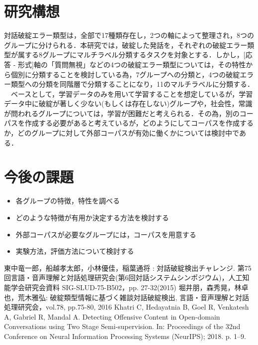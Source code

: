 \documentclass[upLaTex, 10pt,dvipdfmx,a4paper,twocolumn]{jsarticle}
\begin{document}
\section{研究構想}
    対話破綻エラー類型は，全部で17種類存在し，2つの軸によって整理され，8つのグループに分けられる．本研究では，破綻した発話を，それぞれの破綻エラー類型が属する8グループにマルチラベル分類するタスクを対象とする．しかし，[応答 - 形式]軸の「質問無視」などの4つの破綻エラー類型については，その特性から個別に分類することを検討している為，7グループへの分類と，4つの破綻エラー類型への分類を同階層で分類することになり，11のマルチラベルに分類する．\\
    　ベースとして，学習データのみを用いて学習することを想定しているが，学習データ中に破綻が著しく少ない(もしくは存在しない)グループや，社会性，常識が問われるグループについては，学習が困難だと考えられる．その為，別のコーパスを作成する必要があると考えているが，どのようにしてコーパスを作成するか，どのグループに対して外部コーパスが有効に働くかについては検討中である．

\section{今後の課題}
 \begin{itemize}
     \item 各グループの特徴，特性を調べる
     \item どのような特徴が有用か決定する方法を検討する
     \item 外部コーパスが必要なグループには，コーパスを用意する
     \item 実験方法，評価方法について検討する
 \end{itemize} 

 
 
\begin{thebibliography}{99}
     東中竜一郎，船越孝太郎，小林優佳，稲葉通将 : 対話破綻検出チャレンジ. 第75回言語・音声理解と対話処理研究会(第6回対話システムシンポジウム)，人工知能学会研究会資料 SIG-SLUD-75-B502，pp. 27-32(2015)
     堀井朋，森秀晃，林卓也，荒木雅弘: 破綻類型情報に基づく雑談対話破綻検出, 言語・音声理解と対話処理研究会，vol.78, pp.75-80, 2016
    Khatri C, Hedayatnia B, Goel R, Venkatesh A, Gabriel R, Mandal A. Detecting Offensive Content in Open-domain Conversations using Two Stage Semi-supervision. In: Proceedings of the 32nd Conference on Neural Information Processing Systems (NeurIPS); 2018. p. 1–9. 

\end{thebibliography}
\end{document}
